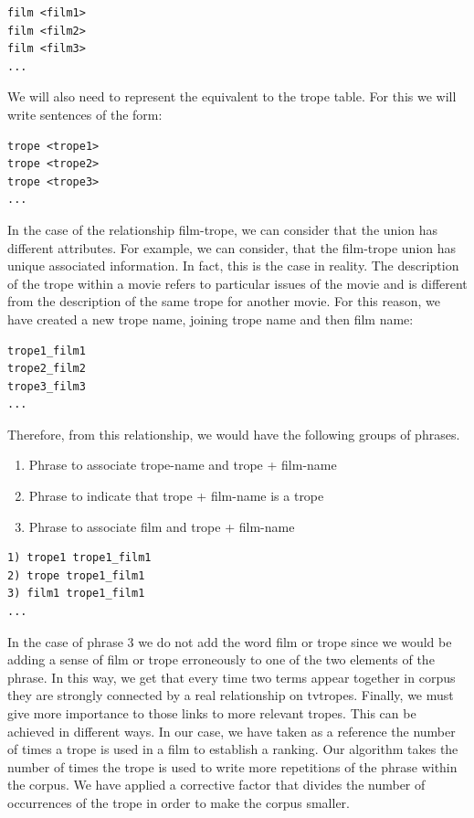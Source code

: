 \documentclass[letterpaper]{article}
\begin{document}
\begin{verbatim}
film <film1>
film <film2>
film <film3>
...
\end{verbatim}

We will also need to represent the equivalent to the trope table. For this we will write sentences of the form:
\begin{verbatim}
trope <trope1>
trope <trope2>
trope <trope3>
...
\end{verbatim}

In the case of the relationship film-trope, we can consider that the union has different attributes. For example, we can consider, that the film-trope union has unique associated information.  In fact, this is the case in reality. The description of the trope within a movie refers to particular issues of the movie and is different from the description of the same trope for another movie. For this reason, we have created a new trope name, joining trope name and then film name:
\begin{verbatim}
trope1_film1
trope2_film2
trope3_film3
...        
\end{verbatim}

Therefore, from this relationship, we would have the following groups of phrases.
\begin{enumerate}
\item Phrase to associate trope-name and trope + film-name
\item Phrase to indicate that trope + film-name is a trope
\item Phrase to associate film and trope + film-name 
\end{enumerate}     

\begin{verbatim}
1) trope1 trope1_film1
2) trope trope1_film1
3) film1 trope1_film1
...        
\end{verbatim}

In the case of phrase 3 we do not add the word film or trope since we would be adding a sense of film or trope erroneously to one of the two elements of the phrase.
In this way, we get that every time two terms appear together in corpus they are strongly connected by a real relationship on tvtropes. Finally, we must give more importance to those links to more relevant tropes. This can be achieved in different ways. In our case, we have taken as a reference the number of times a trope is used in a film to establish a ranking. Our algorithm takes the number of times the trope is used to write more repetitions of the phrase within the corpus. We have applied a corrective factor that divides the number of occurrences of the trope in order to make the corpus smaller.
	
\end{document}
